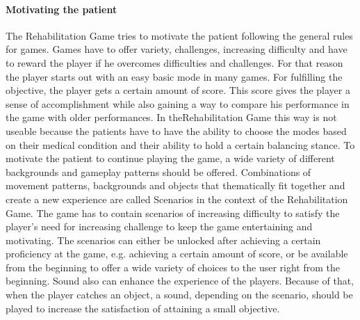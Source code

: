 \paragraph{Motivating the patient}
The Rehabilitation Game tries to motivate the patient following the general rules for games. Games have to offer variety, challenges, increasing difficulty and have to reward the player if he overcomes difficulties and challenges.
For that reason the player starts out with an easy basic mode in many games. For fulfilling the objective, the player gets a certain amount of score. This score gives the player a sense of accomplishment while also gaining a way to compare his performance in the game with older performances. In theRehabilitation Game this way is not useable because the patients have to have the ability to choose the modes based on their medical condition and their ability to hold a certain balancing stance.
To motivate the patient to continue playing the game, a wide variety of different backgrounds and gameplay patterns should be offered. Combinations of movement patterns, backgrounds and objects that thematically fit together and create a new experience are called Scenarios in the context of the Rehabilitation Game. The game has to contain scenarios of increasing difficulty to satisfy the player's need for increasing challenge to keep the game entertaining and motivating. The scenarios can either be unlocked after achieving a certain proficiency at the game, e.g. achieving a certain amount of score, or be available from the beginning to offer a wide variety of choices to the user right from the beginning. Sound also can enhance the experience of the players. Because of that, when the player catches an object, a sound, depending on the scenario, should be played to increase the satisfaction of attaining a small objective.
